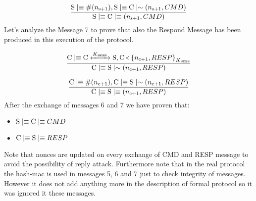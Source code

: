 \[ \frac{ \textnormal{S} \mid\equiv \#(n\textsubscript{s+1}), \textnormal{S} \mid\equiv \textnormal{C} \mid\sim (n\textsubscript{s+1},CMD) } 
        {\textnormal{S} \mid\equiv \textnormal{C} \mid\equiv (n\textsubscript{s+1},CMD)}\]
Let's analyze the Message 7 to prove that also the Respond Message has been produced in this execution of the protocol.

\[ \frac{\textnormal{C} \mid\equiv \textnormal{C} \xleftrightarrow{K\textsubscript{sess }} \textnormal{S},\textnormal{C} \triangleleft { \{ n\textsubscript{c+1},RESP \} }_{K\textsubscript{sess}}}{ \textnormal{C} \mid\equiv \textnormal{S} \mid\sim (n\textsubscript{c+1},RESP)} 
\]

\[ \frac{\textnormal{C} \mid\equiv \#(n\textsubscript{c+1}), \textnormal{C} \mid\equiv \textnormal{S} \mid\sim (n\textsubscript{c+1},RESP) }{\textnormal{C} \mid\equiv \textnormal{S} \mid\equiv (n\textsubscript{c+1},RESP)}
\]
After the exchange of messages 6 and 7 we have proven that:
\begin{itemize}
	\item \( \textnormal{S} \mid\equiv \textnormal{C} \mid\equiv CMD\)
	\item \( \textnormal{C} \mid\equiv \textnormal{S} \mid\equiv RESP\)
\end{itemize}
Note that nonces are updated on every exchange of CMD and RESP message to avoid the possibility of reply attack. Furthermore note that in the real protocol the hash-mac is used in messages 5, 6 and 7 just to check integrity of messages. However it does not add anything more in the description of formal protocol so it was ignored it these messages.
